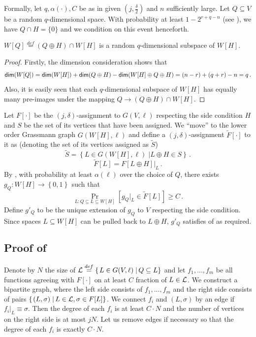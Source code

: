 \documentclass{toc}
\newcommand\sett[2]{\left\{ \left. #1 \;\right\vert #2 \right\}}
\newcommand\set[1]{{\left\{ #1 \right\}}}
\newcommand\Prob[2]{{\Pr_{#1}\left[ {#2} \right]}}
\newcommand\power[1]{\set{0,1}^{#1}}
\newcommand\defeq{\stackrel{def}{=}}
\newcommand*\xor{\mathbin{\oplus}}
\newcommand*\dimm{{\sf dim}}
\begin{document}
Formally, let $q,\alpha(\cdot),C$ be as in  given $(j, \frac{\delta}{2})$ and $n$ sufficiently large.
Let $Q \subseteq V$ be a random $q$-dimensional space. With probability at least $1-2^{r+q-n}$ (see ), we have $Q \cap H = \{0\}$ and we condition
on this event henceforth.
\begin{claim}
$W[Q] \defeq (Q\xor H)\cap W[H]$ is a random $q$-dimensional subspace of $W[H]$.
\end{claim}
\begin{proof} Firstly, the dimension consideration shows that
\[
\dimm(W[Q]) = \dimm(W[H])+\dimm(Q\xor H) - \dimm(W[H]\xor Q\xor H) = (n-r) + (q+r) - n = q\,.%
\]
Also, it is easily seen that each $q$-dimensional subspace of $W[H]$ has equally many
pre-images under the mapping $Q\to (Q\xor H)\cap W[H]$.
\end{proof}
Let $F[\cdot]$ be the $(j,\delta)$-assignment to $G(V,\ell)$ respecting the side condition $H$ and $S$ be the set of its vertices that have been assigned.
 We ``move'' to the lower order Grassmann graph $G(W[H], \ell)$ and define a
$(j,\delta)$-assignment $\tilde{F}[\cdot]$  to it as (denoting the set of its vertices assigned as $\tilde{S}$)
\[
\tilde{S} = \sett{L\in G(W[H],\ell)}{L\xor H\in S}\,.%
\]
\[
\tilde{F}[L] = F[L\xor H]|_{L}\,.%
\]
By , with probability at least $\alpha(\ell)$ over the choice of $Q$, there exists
$g_{Q}\colon W[H]\to\power{}$ such that
\[
  \Prob{L: Q\subseteq L \subseteq W[H]}{g_{Q}|_{L}\in \tilde{F}[L]}\geqslant C\,.%
\]
Define $g'_Q$ to be the unique extension of $g_{Q}$ to $V$ respecting the side condition. Since spaces $L \subseteq W[H]$ can be
pulled back to $L \xor H$, $g'_Q$ satisfies  of  as required.

\subsection{Proof of }\label{appendix:list_dec_upper}
Denote by $N$ the size of ${\cal L} \defeq \sett{L\in G(V,\ell)}{Q\subseteq L}$
and let $f_1,...,f_m$ be all functions
agreeing with $F[\cdot]$ on at least $C$ fraction of $L \in {\cal L}$. We construct a bipartite graph, where the left side
consists of $f_1,...,f_m$ and the right side consists of pairs $\sett{(L,\sigma)}{L\in {\cal L}, \sigma\in F[L]}$. We connect $f_i$
and $(L,\sigma)$ by an edge if ${f_i}|_L\equiv \sigma$. Then the degree of each $f_i$ is at least $C\cdot N$ and the number
of vertices on the right side is at most $j N$. Let us remove edges if necessary so that the degree of each
$f_i$ is exactly $C\cdot N$.
\end{document}

